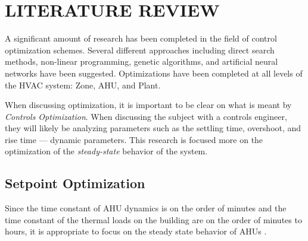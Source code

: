 %
%
%


\chapter{\uppercase {Literature Review}}


A significant amount of research has been completed in the field of
control optimization schemes. Several different approaches including
direct search methods, non-linear programming, genetic algorithms, and
artificial neural networks have been suggested. Optimizations have been
completed at all levels of the HVAC system: Zone, AHU, and Plant.  

When discussing optimization, it is important to be clear on what is
meant by \textit{Controls Optimization}. When discussing the subject
with a controls engineer, they will likely be analyzing parameters such
as the settling time, overshoot, and rise time --- dynamic parameters.
This research is focused more on the optimization of the
\textit{steady-state} behavior of the system. 





\section{Setpoint Optimization}

Since the time constant of AHU dynamics is on the order of minutes and
the time constant of the thermal loads on the building are on the order
of minutes to hours, it is appropriate to focus on the steady state
behavior of AHUs \cite{Bourdouxhe1998}.

